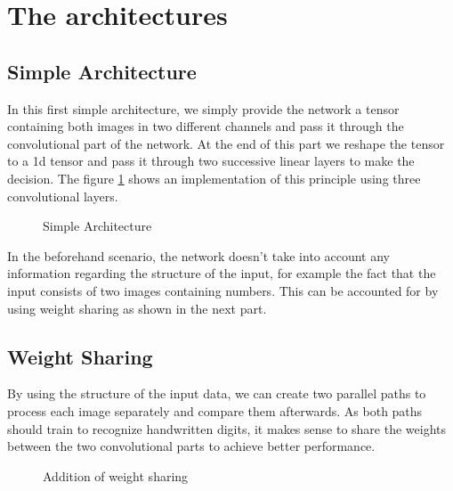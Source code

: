 \documentclass{article}
\begin{document}
\thispagestyle{fancy}

\section{The architectures}

\subsection{Simple Architecture}

In this first simple architecture, we simply provide the network a tensor containing both images in two different channels and pass it through the convolutional part of the network. At the end of this part we reshape the tensor to a 1d tensor and pass it through two successive linear layers to make the decision. The figure \ref{fig:simple} shows an implementation of this principle using three convolutional layers. 

\begin{figure}[H]
\caption{Simple Architecture}
\label{fig:simple}
\end{figure}

In the beforehand scenario, the network doesn't take into account any information regarding the structure of the input, for example the fact that the input consists of two images containing numbers. This can be accounted for by using weight sharing as shown in the next part.

\subsection{Weight Sharing}

By using the structure of the input data, we can create two parallel paths to process each image separately and compare them afterwards. As both paths should train to recognize handwritten digits, it makes sense to share the weights between the two convolutional parts to achieve better performance. 

\begin{figure}[H]
\caption{Addition of weight sharing}
\end{figure}
\end{document}
